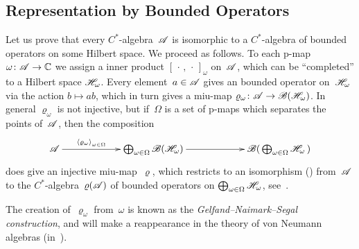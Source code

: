 \documentclass[a]{subfiles}
\begin{document}
\subsection{Representation by Bounded Operators}
\begin{parsec}%
    \begin{point}%
Let us prove that every $C^*$-algebra~$\mathscr{A}$
is isomorphic
to a $C^*$-algebra
of bounded operators on some Hilbert space.
We proceed as follows.
To each p-map $\omega\colon \mathscr{A}\to\mathbb{C}$
we assign a inner product $[\,\cdot\,,\,\cdot\,]_\omega$ on~$\mathscr{A}$,
which can be ``completed'' to a Hilbert space $\mathscr{H}_\omega$.
Every element~$a\in \mathscr{A}$ gives an bounded operator on~$\mathscr{H}_\omega$
via the action $b\mapsto ab$, which in turn gives a 
miu-map $\varrho_\omega\colon \mathscr{A}\to \mathscr{B} (\mathscr{H}_\omega)$.
In general $\varrho_\omega$ is not injective,
but if~$\Omega$ is a set of p-maps which separates the
points of~$\mathscr{A}$,
then the composition
\begin{equation*}
	\xymatrix@C=6em{
		\scrA\ar[r]^-{\left<\varrho_\omega\right>_{\omega\in \Omega}}
		&
		\bigoplus_{\omega\in\Omega} \scrB(\scrH_\omega)
		\ar[r]
		&
		\scrB(\,\bigoplus_{\omega\in\Omega}\scrH_\omega\,)
	}
\end{equation*}
does give an injective miu-map~$\varrho$,
which restricts to an isomorphism 
()
from~$\mathscr{A}$
to the $C^*$-algebra~$\varrho(\mathscr{A})$
of bounded operators
on $\bigoplus_{\omega\in \Omega} \mathscr{H}_\omega$,
see~.

The creation of~$\varrho_\omega$ from~$\omega$
is known as the \emph{Gelfand--Naimark--Segal construction},
and will make a reappearance in the theory of von Neumann algebras
(in~).


\end{point}
\end{parsec}
\end{document}
